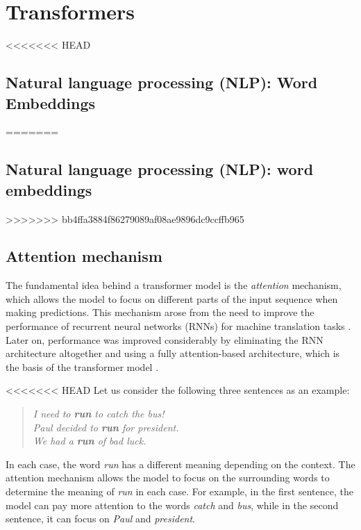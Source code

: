 \section{Transformers}\label{sec:transformers}

<<<<<<< HEAD
\subsection{Natural language processing (NLP): Word Embeddings}\label{subsec:nlp_word_embeddings}
=======
\subsection{Natural language processing (NLP): word embeddings}\label{subsec:nlp_word_embeddings}
>>>>>>> bb4ffa3884f86279089af08ae9896dc9ccffb965


\subsection{Attention mechanism}\label{subsec:attention_mechanism}

The fundamental idea behind a transformer model is the \emph{attention} mechanism, which allows the model to focus on different parts of the input sequence when making predictions. This mechanism arose from the need to improve the performance of recurrent neural networks (RNNs) for machine translation tasks \cite{bahdanauNeuralMachineTranslation2016}. Later on, performance was improved considerably by eliminating the RNN architecture altogether and using a fully attention-based architecture, which is the basis of the transformer model \cite{vaswaniAttentionAllYou2017}. 

<<<<<<< HEAD
Let us consider the following three sentences as an example:

\begin{quote}
    \textit{I need to \textbf{run} to catch the bus!}  \\
    \textit{Paul decided to \textbf{run} for president.} \\
    \textit{We had a \textbf{run} of bad luck.} 
\end{quote}

In each case, the word \textit{run} has a different meaning depending on the context. The attention mechanism allows the model to focus on the surrounding words to determine the meaning of \textit{run} in each case. For example, in the first sentence, the model can pay more attention to the words \textit{catch} and \textit{bus}, while in the second sentence, it can focus on \textit{Paul} and \textit{president}.

